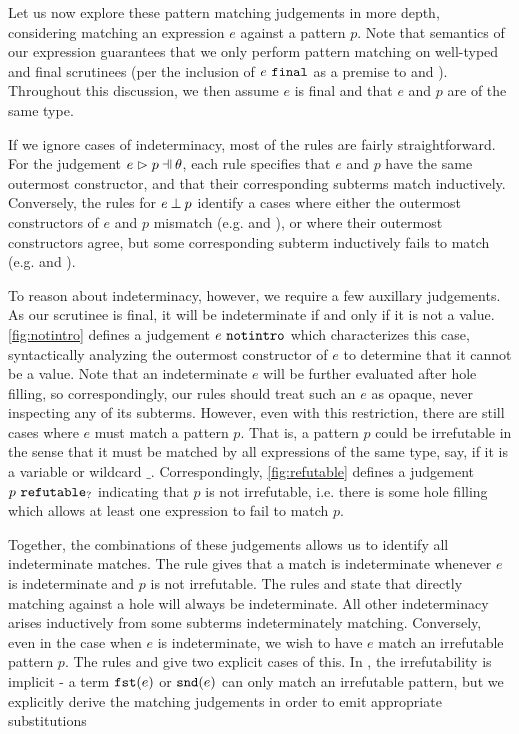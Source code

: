 



Let us now explore these pattern matching judgements in more depth, considering matching an expression $e$ against a pattern $p$. Note that semantics of our expression guarantees that we only perform pattern matching on well-typed and final scrutinees (per the inclusion of $e ~\mathtt{final}$ as a premise to \ITSuccMatch and \ITFailMatch). Throughout this discussion, we then assume $e$ is final and that $e$ and $p$ are of the same type.

If we ignore cases of indeterminacy, most of the rules are fairly straightforward. For the judgement $\hpatmatch{e}{p}{\theta}$, each rule specifies that $e$ and $p$ have the same outermost constructor, and that their corresponding subterms match inductively. Conversely, the rules for $e \mathbin{\bot} p$ identify a cases where either the outermost constructors of $e$ and $p$ mismatch (e.g. \NMInl and \NMInr), or where their outermost constructors agree, but some corresponding subterm inductively fails to match (e.g. \NMPairL and \NMPairR).

To reason about indeterminacy, however, we require a few auxillary judgements. As our scrutinee is final, it will be indeterminate if and only if it is not a value. \autoref{fig:notintro} defines a judgement $e ~\mathtt{notintro}$ which characterizes this case, syntactically analyzing the outermost constructor of $e$ to determine that it cannot be a value. Note that an indeterminate $e$ will be further evaluated after hole filling, so correspondingly, our rules should treat such an $e$ as opaque, never inspecting any of its subterms. However, even with this restriction, there are still cases where $e$ must match a pattern $p$. That is, a pattern $p$ could be irrefutable in the sense that it must be matched by all expressions of the same type, say, if it is a variable  or wildcard $\_$. Correspondingly, \autoref{fig:refutable} defines a judgement $p ~\mathtt{refutable}_?$ indicating that $p$ is not irrefutable, i.e. there is some hole filling which allows at least one expression to fail to match $p$.

Together, the combinations of these judgements allows us to identify all indeterminate matches. The rule \MMNotIntro gives that a match is indeterminate whenever $e$ is indeterminate and $p$ is not irrefutable. The rules \MMEHole and \MMHole state that directly matching against a hole will always be indeterminate. All other indeterminacy arises inductively from some subterms indeterminately matching. Conversely, even in the case when $e$ is indeterminate, we wish to have $e$ match an irrefutable pattern $p$. The rules \MVar and \MWild give two explicit cases of this. In \MNotIntroPair, the irrefutability is implicit - a term $\mathtt{fst}(e)$ or $\mathtt{snd}(e)$ can only match an irrefutable pattern, but we explicitly derive the matching judgements in order to emit appropriate substitutions

